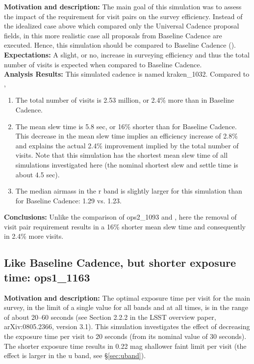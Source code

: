 {\bf Motivation and description:}
The main goal of this simulation was to assess the impact of the requirement for visit pairs
on the survey efficiency. Instead of the idealized case above which compared only the
Universal Cadence proposal fields, in this more realistic case all proposals from Baseline
Cadence are executed. Hence, this simulation should be compared to Baseline Cadence
(). \\

{\bf Expectations:} A slight, or no, increase in surveying efficiency and thus the total
number of visits is expected when compared to Baseline Cadence. \\

{\bf Analysis Results:}  This simulated cadence is named kraken\_1032. Compared
to ,
\begin{enumerate}
\item The total number of visits is 2.53 million, or 2.4\% more than in Baseline Cadence.
\item
The mean slew time is 5.8 sec, or 16\% shorter than for Baseline Cadence. This decrease
in the mean slew time implies an efficiency increase of 2.8\% and explains the actual
2.4\% improvement implied by the total number of visits.  Note that this simulation has
the shortest mean slew time of all simulations investigated here (the nominal shortest
slew and settle time is about 4.5 sec).
\item The median airmass in the r band is slightly larger for this simulation than
for Baseline Cadence: 1.29 vs. 1.23.
\end{enumerate}


{\bf Conclusions:}
Unlike the comparison of ops2\_1093 and , here the removal of visit pair
requirement results in a 16\% shorter mean slew time and consequently in 2.4\% more visits.



\subsection{Like Baseline Cadence, but shorter exposure time: ops1\_1163}


{\bf Motivation and description:} The optimal exposure time per visit for the main survey,
in the limit of a single value for all bands and at all times, is in the range of about 20--60 seconds
(see Section 2.2.2 in the LSST overview paper, arXiv:0805.2366, version 3.1).
This simulation investigates the effect of decreasing the exposure time per visit to
20 seconds (from its nominal value of 30 seconds). The shorter exposure time results
in 0.22 mag shallower faint limit per visit (the effect is larger in the u band, see \S\ref{sec:uband}). \\

